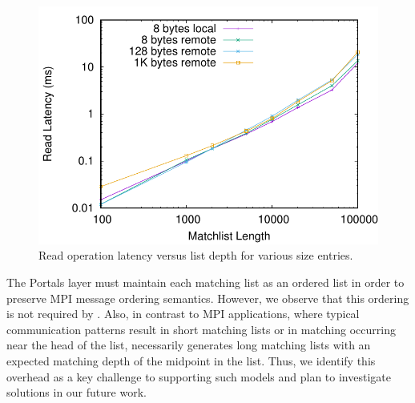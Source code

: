 \begin{figure}
    \centering
    \includegraphics[width=\linewidth]{plots/mlen}
    \caption{Read operation latency versus list depth for various size entries.}
    \label{fig:mlen}
\end{figure}

The Portals layer must maintain each matching list as an ordered list in order
to preserve MPI message ordering semantics.  However, we observe that this
ordering is not required by \pdht.  Also, in contrast to MPI applications,
where typical communication patterns result in short matching lists or in
matching occurring near the head of the list, \pdht necessarily generates long
matching lists with an expected matching depth of the midpoint in the list.
Thus, we identify this overhead as a key challenge to supporting such models
and plan to investigate solutions in our future work.

